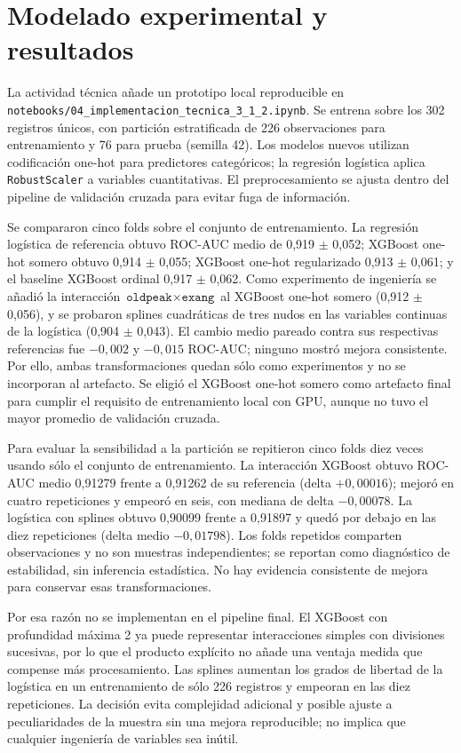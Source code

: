 \section{Modelado experimental y resultados}
\label{sec:modelado-resultados}

La actividad técnica añade un prototipo local reproducible en \texttt{notebooks/04\_implementacion\_tecnica\_3\_1\_2.ipynb}. Se entrena sobre los 302 registros únicos, con partición estratificada de 226 observaciones para entrenamiento y 76 para prueba (semilla 42). Los modelos nuevos utilizan codificación one-hot para predictores categóricos; la regresión logística aplica \texttt{RobustScaler} a variables cuantitativas. El preprocesamiento se ajusta dentro del pipeline de validación cruzada para evitar fuga de información.

Se compararon cinco folds sobre el conjunto de entrenamiento. La regresión logística de referencia obtuvo ROC-AUC medio de 0,919 $\pm$ 0,052; XGBoost one-hot somero obtuvo 0,914 $\pm$ 0,055; XGBoost one-hot regularizado 0,913 $\pm$ 0,061; y el baseline XGBoost ordinal 0,917 $\pm$ 0,062. Como experimento de ingeniería se añadió la interacción $\texttt{oldpeak}\times\texttt{exang}$ al XGBoost one-hot somero (0,912 $\pm$ 0,056), y se probaron splines cuadráticas de tres nudos en las variables continuas de la logística (0,904 $\pm$ 0,043). El cambio medio pareado contra sus respectivas referencias fue $-0,002$ y $-0,015$ ROC-AUC; ninguno mostró mejora consistente. Por ello, ambas transformaciones quedan sólo como experimentos y no se incorporan al artefacto. Se eligió el XGBoost one-hot somero como artefacto final para cumplir el requisito de entrenamiento local con GPU, aunque no tuvo el mayor promedio de validación cruzada.

Para evaluar la sensibilidad a la partición se repitieron cinco folds diez veces usando sólo el conjunto de entrenamiento. La interacción XGBoost obtuvo ROC-AUC medio 0,91279 frente a 0,91262 de su referencia (delta $+0,00016$); mejoró en cuatro repeticiones y empeoró en seis, con mediana de delta $-0,00078$. La logística con splines obtuvo 0,90099 frente a 0,91897 y quedó por debajo en las diez repeticiones (delta medio $-0,01798$). Los folds repetidos comparten observaciones y no son muestras independientes; se reportan como diagnóstico de estabilidad, sin inferencia estadística. No hay evidencia consistente de mejora para conservar esas transformaciones.

Por esa razón no se implementan en el pipeline final. El XGBoost con profundidad máxima 2 ya puede representar interacciones simples con divisiones sucesivas, por lo que el producto explícito no añade una ventaja medida que compense más procesamiento. Las splines aumentan los grados de libertad de la logística en un entrenamiento de sólo 226 registros y empeoran en las diez repeticiones. La decisión evita complejidad adicional y posible ajuste a peculiaridades de la muestra sin una mejora reproducible; no implica que cualquier ingeniería de variables sea inútil.


